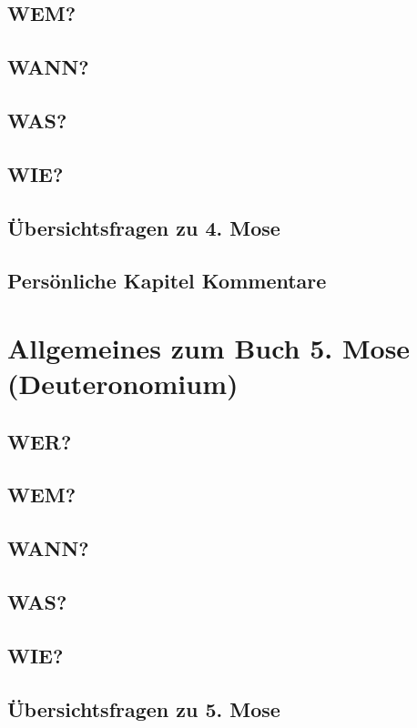 \subsection{WEM?}
\subsection{WANN?}
\subsection{WAS?}
\subsection{WIE?}
\subsection{Übersichtsfragen zu 4. Mose}
    
\subsection{Persönliche Kapitel Kommentare}
\section{Allgemeines zum Buch 5. Mose (Deuteronomium)}
\subsection{WER?}
\subsection{WEM?}
\subsection{WANN?}
\subsection{WAS?}
\subsection{WIE?}
\subsection{Übersichtsfragen zu 5. Mose}
    

